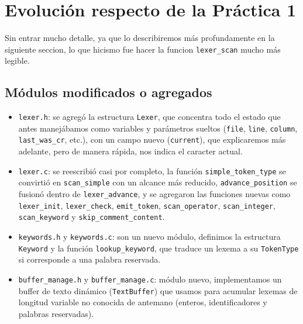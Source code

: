 \documentclass[12pt,letterpaper]{article}
\begin{document}
\bigskip


\section*{Evolución respecto de la Práctica 1}

Sin entrar mucho detalle, ya que lo describiremos más profundamente en la siguiente seccion, lo que hicismo
fue hacer la funcion \texttt{lexer\_scan} mucho más legible.

\subsection*{Módulos modificados o agregados}

\begin{itemize}
\item \texttt{lexer.h}: se agregó la estructura \texttt{Lexer}, que concentra todo el estado que antes
  manejábamos como variables y parámetros sueltos (\texttt{file}, \texttt{line}, \texttt{column}, \texttt{last\_was\_cr}, etc.), con un campo nuevo (\texttt{current}), que explicaremos más adelante, pero de manera rápida, nos indica el caracter actual.
\item \texttt{lexer.c}: se reescribió casi por completo, la función \texttt{simple\_token\_type} se convirtió en
  \texttt{scan\_simple} con un alcance más reducido, \texttt{advance\_position} se fusionó dentro de
  \texttt{lexer\_advance}, y se agregaron las funciones nuevas como \texttt{lexer\_init}, \texttt{lexer\_check},
  \texttt{emit\_token}, \texttt{scan\_operator}, \texttt{scan\_integer},
  \texttt{scan\_keyword} y \texttt{skip\_comment\_content}.
\item \texttt{keywords.h} y \texttt{keywords.c}: son un nuevo módulo, definimos la estructura \texttt{Keyword}
  y la función \texttt{lookup\_keyword}, que traduce un lexema a su \texttt{TokenType} si corresponde a una
  palabra reservada.
\item \texttt{buffer\_manage.h} y \texttt{buffer\_manage.c}: módulo nuevo, implementamos un buffer de texto
  dinámico (\texttt{TextBuffer}) que usamos para acumular lexemas de longitud variable no conocida de antemano
  (enteros, identificadores y palabras reservadas).
\end{itemize}
\end{document}
